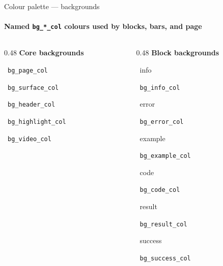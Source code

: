 \documentclass[sans,numeric,titlesplit]{qslides}
\begin{document}
\begin{frame}{Colour palette --- backgrounds}
  \framesubtitle{Named \texttt{bg\_*\_col} colours used by blocks, bars, and page}
  \begin{columns}[onlytextwidth,T]
    \begin{column}{0.48\linewidth}
      \textbf{Core backgrounds}\\[0.5ex]
      \colorbox{bg_page_col}{\color{fg_body_col}\strut\hspace{0.9em}}\ \texttt{bg\_page\_col}\\[0.3ex]
      \colorbox{bg_surface_col}{\color{fg_body_col}\strut\hspace{0.9em}}\ \texttt{bg\_surface\_col}\\[0.3ex]
      \colorbox{bg_header_col}{\color{fg_body_col}\strut\hspace{0.9em}}\ \texttt{bg\_header\_col}\\[0.3ex]
      \colorbox{bg_highlight_col}{\color{fg_body_col}\strut\hspace{0.9em}}\ \texttt{bg\_highlight\_col}\\[0.3ex]
      \colorbox{bg_video_col}{\color{fg_body_col}\strut\hspace{0.9em}}\ \texttt{bg\_video\_col}
    \end{column}
    \begin{column}{0.48\linewidth}
      \textbf{Block backgrounds}\\[0.5ex]
      \colorbox{bg_info_col}{\color{fg_body_col}\strut\ info\hspace{0.5em}}\ \texttt{bg\_info\_col}\\[0.3ex]
      \colorbox{bg_error_col}{\color{fg_body_col}\strut\ error\hspace{0.5em}}\ \texttt{bg\_error\_col}\\[0.3ex]
      \colorbox{bg_example_col}{\color{fg_body_col}\strut\ example\hspace{0.5em}}\ \texttt{bg\_example\_col}\\[0.3ex]
      \colorbox{bg_code_col}{\color{fg_body_col}\strut\ code\hspace{0.5em}}\ \texttt{bg\_code\_col}\\[0.3ex]
      \colorbox{bg_result_col}{\color{fg_body_col}\strut\ result\hspace{0.5em}}\ \texttt{bg\_result\_col}\\[0.3ex]
      \colorbox{bg_success_col}{\color{fg_body_col}\strut\ success\hspace{0.5em}}\ \texttt{bg\_success\_col}
    \end{column}
  \end{columns}
\end{frame}
\end{document}

